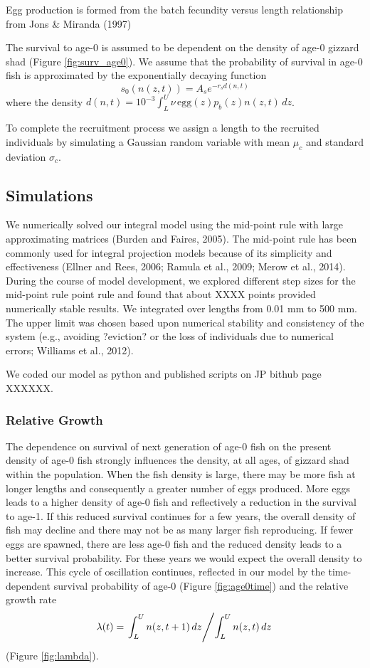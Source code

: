 \documentclass[11pt,oneside]{amsart}
\def\ds{\displaystyle}
\theoremstyle{definition}
\begin{document}
Egg production is formed from the batch fecundity versus length relationship from Jons \& Miranda (1997)


The survival to age-0 is assumed to be dependent on the density of age-0 gizzard shad (Figure \ref{fig:surv_age0}).  We assume that the probability of survival in age-0 fish is approximated by the exponentially decaying function
\begin{equation}\label{eq:age0surv}
s_0(n(z,t)) = A_s e^{-r_s d(n,t)}
\end{equation}
where the density $\ds d(n,t) = 10^{-3} \int_L^U \nu \, \mbox{egg}(z) p_b(z) n(z,t) \, dz$. 

To complete the recruitment process we assign a length to the recruited individuals by simulating a Gaussian random variable with mean $\mu_c$ and standard deviation $\sigma_c$.

\subsection{Simulations}

We numerically solved our integral model using the mid-point rule with large approximating matrices (Burden and Faires, 2005). The mid-point rule has been commonly used for integral projection models because of its simplicity and effectiveness (Ellner and Rees, 2006; Ramula et al., 2009; Merow et al., 2014). During the course of model development, we explored different step sizes for the mid-point rule point rule and found that about XXXX points provided numerically stable results. We integrated over lengths from 0.01 mm to 500 mm. The upper limit was chosen based upon numerical stability and consistency of the system (e.g., avoiding ?eviction? or the loss of individuals due to numerical errors; Williams et al., 2012). 

We coded our model as python and published scripts on JP bithub page XXXXXX.

\subsubsection{Relative Growth}
The dependence on survival of next generation of age-0 fish on the present density of age-0 fish strongly influences the density, at all ages, of gizzard shad within the population. When the fish density is large, there may be more fish at longer lengths and consequently a greater number of eggs produced.  More eggs leads to a higher density of age-0 fish and reflectively a reduction in the survival to age-1.  If this reduced survival continues for a few years, the overall density of fish may decline and there may not be as many larger fish reproducing.  If fewer eggs are spawned, there are less age-0 fish and the reduced density leads to a better survival probability.  For these years we would expect the overall density to increase.  This cycle of oscillation continues, reflected in our model by the time-dependent survival probability of age-0 (Figure \ref{fig:age0time}) and the relative growth rate 
$$ \lambda(t) = \left. \int_L^U n(z,t+1) \, dz \middle/ \int_L^U n(z,t) \, dz \right.$$ (Figure \ref{fig:lambda}).
\end{document}
